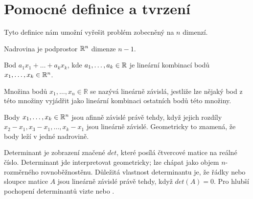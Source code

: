 \section{Pomocné definice a tvrzení}
\label{sec:pomocne-definice}
Tyto definice nám umožní vyřešit problém zobecněný na $n$ dimenzí.

\begin{definition}[Nadrovina]
  \label{definice:nadrovina}
  Nadrovina je podprostor $\mathbb{R}^n$ dimenze $n-1$.
\end{definition}

\begin{definition}
  \label{definice:linearni-kombinace}
  Bod $a_1x_1+\dots+a_kx_k$, kde $a_1, \dots, a_k \in \mathbb{R}$ je lineární kombinací bodů $x_1, \dots, x_k \in \mathbb{R}^n$. \autocite[67]{jindrichbecvarLinearniAlgebra2005}
\end{definition}

\begin{definition}
  \label{definice:linearni-zavislost}
  Množina bodů $x_1, \dots, x_n \in \mathbb{R}$ se nazývá lineárně závislá, jestliže lze nějaký bod z této množiny vyjádřit jako lineární kombinaci ostatních bodů této množiny. \autocite[78]{jindrichbecvarLinearniAlgebra2005}
\end{definition}

\begin{definition}
  \label{definice:afinni-zavislost}
  Body $x_1, \ldots, x_k \in \mathbb{R}^n$ jsou afinně závislé právě tehdy, když jejich rozdíly $x_2-x_1, x_3-x_1, \dots, x_k-x_1$ jsou lineárně závislé. Geometricky to znamená, že body leží v jedné nadrovině. \autocite[4]{matousekConvexity2003}
\end{definition}

\begin{tvrzeni}
  \label{tvrzeni:determinant}
  Determinant je zobrazení značené $det$, které posílá čtvercové matice na reálné číslo. Determinant jde interpretovat geometricky; lze chápat jako objem $n$-rozměrného rovnoběžnostěnu. Důležitá vlastnost determinantu je, že řádky nebo sloupce matice $A$ jsou lineárně závislé právě tehdy, když $det(A)=0$. \autocites[224]{danmargalitInteractiveLinearAlgebra2019}[4]{matousekConvexity2003}
  Pro hlubší pochopení determinantů vizte \autocite[164]{jindrichbecvarLinearniAlgebra2005} nebo \autocite[187]{danmargalitInteractiveLinearAlgebra2019}.
\end{tvrzeni}

